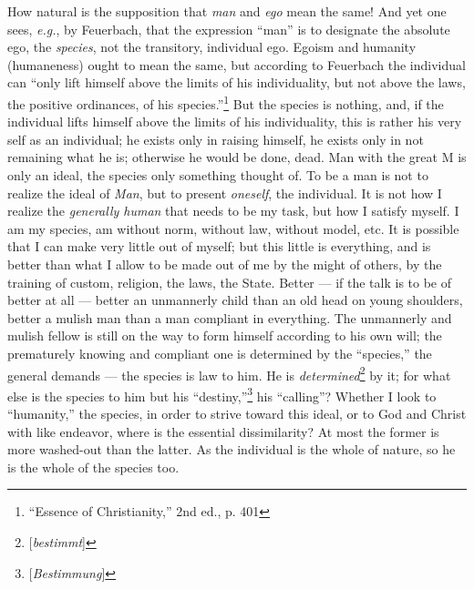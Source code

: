 How natural is the supposition that \textit{man} and \textit{ego} mean the 
same! And yet one sees, \textit{e.g.}, by Feuerbach, that the expression 
``man'' is to designate the absolute ego, the \textit{species}, not the 
transitory, individual ego. Egoism and humanity (humaneness) ought to mean the 
same, but according to Feuerbach the individual can ``only lift himself above 
the limits of his individuality, but not above the laws, the positive 
ordinances, of his species.''\footnote{``Essence of Christianity,'' 2nd 
ed., p. 401} But the species is nothing, and, if the individual lifts himself 
above the limits of his individuality, this is rather his very self as an 
individual; he exists only in raising himself, he exists only in not remaining 
what he is; otherwise he would be done, dead. Man with the great M is only an 
ideal, the species only something thought of. To be a man is not to realize 
the ideal of \textit{Man}, but to present \textit{oneself}, the individual. It 
is not how I realize the \textit{generally human} that needs to be my task, 
but how I satisfy myself. I am my species, am without norm, without law, 
without model, etc. It is possible that I can make very little out of myself; 
but this little is everything, and is better than what I allow to be made out 
of me by the might of others, by the training of custom, religion, the laws, 
the State. Better --- if the talk is to be of better at all --- better an 
unmannerly child than an old head on young shoulders, better a mulish man than 
a man compliant in everything. The unmannerly and mulish fellow is still on 
the way to form himself according to his own will; the prematurely knowing and 
compliant one is determined by the ``species,'' the general demands --- the 
species is law to him. He is \textit{determined}\footnote{[\textit{bestimmt}]} 
by it; for what else is the species to him but his 
``destiny,''\footnote{[\textit{Bestimmung}]} his ``calling''? Whether I 
look to ``humanity,'' the species, in order to strive toward this ideal, or 
to God and Christ with like endeavor, where is the essential dissimilarity? At 
most the former is more washed-out than the latter. As the individual is the 
whole of nature, so he is the whole of the species too.

